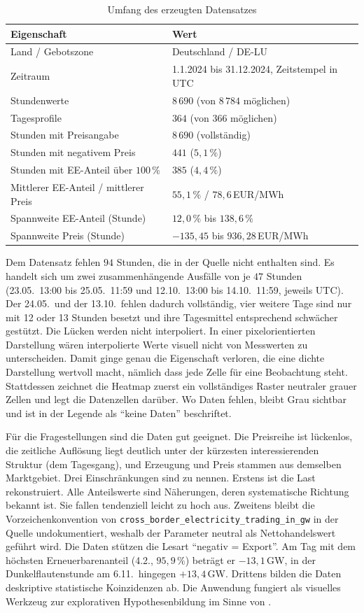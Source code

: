 \begin{table}[H]
\centering\small
\caption{Umfang des erzeugten Datensatzes}\label{tab:umfang}
\begin{tabular}{ll}
\toprule
Eigenschaft & Wert \\
\midrule
Land / Gebotszone & Deutschland / DE-LU \\
Zeitraum & 1.1.2024 bis 31.12.2024, Zeitstempel in UTC \\
Stundenwerte & $8\,690$ (von $8\,784$ möglichen) \\
Tagesprofile & $364$ (von $366$ möglichen) \\
Stunden mit Preisangabe & $8\,690$ (vollständig) \\
Stunden mit negativem Preis & $441$ ($5{,}1\,\%$) \\
Stunden mit EE-Anteil über $100\,\%$ & $385$ ($4{,}4\,\%$) \\
Mittlerer EE-Anteil / mittlerer Preis & $55{,}1\,\%$ / $78{,}6$\,EUR/MWh \\
Spannweite EE-Anteil (Stunde) & $12{,}0\,\%$ bis $138{,}6\,\%$ \\
Spannweite Preis (Stunde) & $-135{,}45$ bis $936{,}28$\,EUR/MWh \\
\bottomrule
\end{tabular}
\end{table}

Dem Datensatz fehlen $94$ Stunden, die in der Quelle nicht enthalten sind. Es handelt sich um zwei
zusammenhängende Ausfälle von je $47$ Stunden (23.05.\ 13:00 bis 25.05.\ 11:59 und 12.10.\ 13:00 bis
14.10.\ 11:59, jeweils UTC). Der 24.05.\ und der 13.10.\ fehlen dadurch vollständig, vier weitere Tage
sind nur mit 12 oder 13 Stunden besetzt und ihre Tagesmittel entsprechend schwächer gestützt. Die Lücken
werden nicht interpoliert. In einer pixelorientierten Darstellung wären interpolierte Werte visuell nicht
von Messwerten zu unterscheiden. Damit ginge genau die Eigenschaft verloren, die eine dichte Darstellung
wertvoll macht, nämlich dass jede Zelle für eine Beobachtung steht. Stattdessen zeichnet die Heatmap zuerst
ein vollständiges Raster neutraler grauer Zellen und legt die Datenzellen darüber. Wo Daten fehlen, bleibt
Grau sichtbar und ist in der Legende als \enquote{keine Daten} beschriftet.

Für die Fragestellungen sind die Daten gut geeignet. Die Preisreihe ist lückenlos, die zeitliche
Auflösung liegt deutlich unter der kürzesten interessierenden Struktur (dem Tagesgang), und
Erzeugung und Preis stammen aus demselben Marktgebiet. Drei Einschränkungen sind zu nennen. Erstens
ist die Last rekonstruiert. Alle Anteilswerte sind Näherungen, deren systematische Richtung bekannt
ist. Sie fallen tendenziell leicht zu hoch aus. Zweitens bleibt die Vorzeichenkonvention von
\texttt{cross\_border\_electricity\_trading\_in\_gw} in der Quelle undokumentiert, weshalb der Parameter
neutral als Nettohandelswert geführt wird. Die Daten stützen die Lesart \enquote{negativ =
Export}. Am Tag mit dem höchsten Erneuerbarenanteil (4.2., $95{,}9\,\%$) beträgt er $-13{,}1$\,GW, in
der Dunkelflautenstunde am 6.11.\ hingegen $+13{,}4$\,GW. Drittens bilden die Daten deskriptive
statistische Koinzidenzen ab. Die Anwendung fungiert als visuelles Werkzeug zur explorativen
Hypothesenbildung im Sinne von \cite{Keim2008}.
